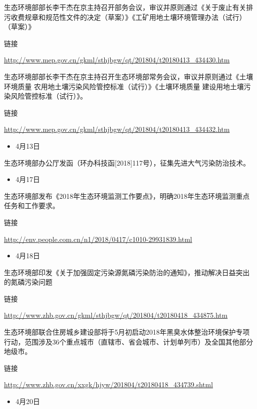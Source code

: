 \documentclass[]{book}
\providecommand{\tightlist}{%
  \setlength{\itemsep}{0pt}\setlength{\parskip}{0pt}}
\begin{document}
生态环境部部长李干杰在京主持召开部务会议，审议并原则通过《关于废止有关排污收费规章和规范性文件的决定（草案）》《工矿用地土壤环境管理办法（试行）（草案）》

链接

\url{http://www.mep.gov.cn/gkml/sthjbgw/qt/201804/t20180413_434430.htm}

生态环境部部长李干杰在京主持召开生态环境部常务会议，审议并原则通过《土壤环境质量 农用地土壤污染风险管控标准（试行）》《土壤环境质量 建设用地土壤污染风险管控标准（试行）》。

链接

\url{http://www.mep.gov.cn/gkml/sthjbgw/qt/201804/t20180413_434432.htm}

\begin{itemize}
\tightlist
\item
  4月13日
\end{itemize}

生态环境部办公厅发函（环办科技函{[}2018{]}117号），征集先进大气污染防治技术。

\begin{itemize}
\tightlist
\item
  4月17日
\end{itemize}

生态环境部发布《2018年生态环境监测工作要点》，明确2018年生态环境监测重点任务和工作要求。

链接

\url{http://env.people.com.cn/n1/2018/0417/c1010-29931839.html}

\begin{itemize}
\tightlist
\item
  4月18日
\end{itemize}

生态环境部印发《关于加强固定污染源氮磷污染防治的通知》，推动解决日益突出的氮磷污染问题

链接

\url{http://www.zhb.gov.cn/gkml/sthjbgw/qt/201804/t20180418_434875.htm}

生态环境部联合住房城乡建设部将于5月初启动2018年黑臭水体整治环境保护专项行动，范围涉及36个重点城市（直辖市、省会城市、计划单列市）及全国其他部分地级市。

链接

\url{http://www.zhb.gov.cn/xxgk/hjyw/201804/t20180418_434739.shtml}

\begin{itemize}
\tightlist
\item
  4月20日
\end{itemize}
\end{document}
